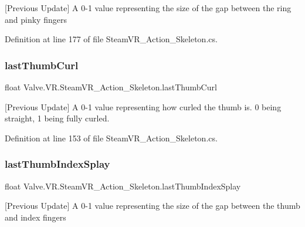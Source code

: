\mbox{[}Previous Update\mbox{]} A 0-\/1 value representing the size of the gap between the ring and pinky fingers 



Definition at line 177 of file Steam\+V\+R\+\_\+\+Action\+\_\+\+Skeleton.\+cs.

\mbox{\label{class_valve_1_1_v_r_1_1_steam_v_r___action___skeleton_af5079276a5c75672dfeb3ac2b9d340c1}} 
\subsubsection{\texorpdfstring{lastThumbCurl}{lastThumbCurl}}
{\footnotesize\ttfamily float Valve.\+V\+R.\+Steam\+V\+R\+\_\+\+Action\+\_\+\+Skeleton.\+last\+Thumb\+Curl\hspace{0.3cm}{\ttfamily [get]}}



\mbox{[}Previous Update\mbox{]} A 0-\/1 value representing how curled the thumb is. 0 being straight, 1 being fully curled. 



Definition at line 153 of file Steam\+V\+R\+\_\+\+Action\+\_\+\+Skeleton.\+cs.

\mbox{\label{class_valve_1_1_v_r_1_1_steam_v_r___action___skeleton_ac6fd8dcfc5104e14be27ebfa567d55b4}} 
\subsubsection{\texorpdfstring{lastThumbIndexSplay}{lastThumbIndexSplay}}
{\footnotesize\ttfamily float Valve.\+V\+R.\+Steam\+V\+R\+\_\+\+Action\+\_\+\+Skeleton.\+last\+Thumb\+Index\+Splay\hspace{0.3cm}{\ttfamily [get]}}



\mbox{[}Previous Update\mbox{]} A 0-\/1 value representing the size of the gap between the thumb and index fingers 



